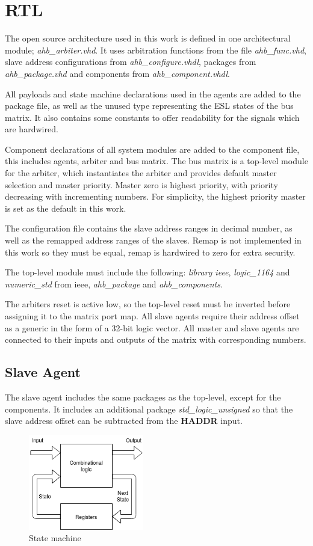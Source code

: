 \section{RTL}
The open source architecture used in this work is defined in one architectural module; \textit{ahb\_arbiter.vhd}. It uses arbitration functions from the file \textit{ahb\_func.vhd}, slave address configurations from \textit{ahb\_configure.vhdl}, packages from \textit{ahb\_package.vhd} and components from \textit{ahb\_component.vhdl}. \par
All payloads and state machine declarations used in the agents are added to the package file, as well as the unused type representing the ESL states of the bus matrix. It also contains some constants to offer readability for the signals which are hardwired. \par
Component declarations of all system modules are added to the component file, this includes agents, arbiter and bus matrix. The bus matrix is a top-level module for the arbiter, which instantiates the arbiter and provides default master selection and master priority. Master zero is highest priority, with priority decreasing with incrementing numbers. For simplicity, the highest priority master is set as the default in this work. \par
The configuration file contains the slave address ranges in decimal number, as well as the remapped address ranges of the slaves. Remap is not implemented in this work so they must be equal, remap is hardwired to zero for extra security. \par
The top-level module must include the following: \textit{library ieee}, \textit{logic\_1164} and \textit{numeric\_std} from ieee, \textit{ahb\_package} and \textit{ahb\_components}. \par
The arbiters reset is active low, so the top-level reset must be inverted before assigning it to the matrix port map. All slave agents require their address offset as a generic in the form of a 32-bit logic vector. All master and slave agents are connected to their inputs and outputs of the matrix with corresponding numbers. 

\subsection{Slave Agent}
The slave agent includes the same packages as the top-level, except for the components. It includes an additional package \textit{std\_logic\_unsigned} so that the slave address offset can be subtracted from the \textbf{HADDR} input. \par
\begin{figure}
\includegraphics[width=5cm]{figs/hw/statemachine.png}
\caption{State machine}\label{fig:statem}
\end{figure} 

